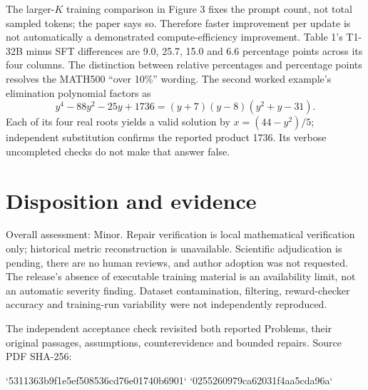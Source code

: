 \documentclass[10pt]{article}
\begin{document}
The larger-\(K\) training comparison in Figure 3 fixes the prompt count, not total sampled tokens; the paper says so. Therefore faster improvement per update is not automatically a demonstrated compute-efficiency improvement. Table 1’s T1-32B minus SFT differences are 9.0, 25.7, 15.0 and 6.6 percentage points across its four columns. The distinction between relative percentages and percentage points resolves the MATH500 “over 10\%” wording. The second worked example’s elimination polynomial factors as \[y^4-88y^2-25y+1736=(y+7)(y-8)(y^2+y-31).\] Each of its four real roots yields a valid solution by \(x=(44-y^2)/5\); independent substitution confirms the reported product 1736. Its verbose uncompleted checks do not make that answer false.\par
\section*{Disposition and evidence}
Overall assessment: Minor. Repair verification is local mathematical verification only; historical metric reconstruction is unavailable. Scientific adjudication is pending, there are no human reviews, and author adoption was not requested. The release’s absence of executable training material is an availability limit, not an automatic severity finding. Dataset contamination, filtering, reward-checker accuracy and training-run variability were not independently reproduced.\par
The independent acceptance check revisited both reported Problems, their original passages, assumptions, counterevidence and bounded repairs. Source PDF SHA-256:\par
`5311363b9f1e5ef508536cd76e01740b6901`
`0255260979ca62031f4aa5cda96a`\par
\end{document}

